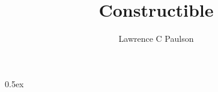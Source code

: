 \documentclass[11pt,a4paper]{article}
\begin{document}
\title{Constructible}
\author{Lawrence C Paulson}
\maketitle

\tableofcontents

\parindent 0pt\parskip 0.5ex



%
%
\end{document}
